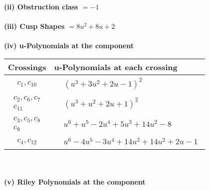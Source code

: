 \documentclass[1p]{elsarticle_modified}
\theoremstyle{definition}
\begin{document}
\flushleft \textbf{(ii) Obstruction class $= -1$}\\~\\
\flushleft \textbf{(iii) Cusp Shapes $= 8 u^2+8 u+2$}\\~\\
\newpage\renewcommand{\arraystretch}{1}
\flushleft \textbf{(iv) u-Polynomials at the component}\newline \\
\begin{tabular}{m{50pt}|m{274pt}}
Crossings & \hspace{64pt}u-Polynomials at each crossing \\
\hline $$\begin{aligned}c_{1},c_{10}\end{aligned}$$&$\begin{aligned}
&(u^3+3 u^2+2 u-1)^2
\end{aligned}$\\
\hline $$\begin{aligned}c_{2},c_{6},c_{7}\\c_{11}\end{aligned}$$&$\begin{aligned}
&(u^3+u^2+2 u+1)^2
\end{aligned}$\\
\hline $$\begin{aligned}c_{3},c_{5},c_{8}\\c_{9}\end{aligned}$$&$\begin{aligned}
&u^6+u^5-2 u^4+5 u^3+14 u^2-8
\end{aligned}$\\
\hline $$\begin{aligned}c_{4},c_{12}\end{aligned}$$&$\begin{aligned}
&u^6-4 u^5-3 u^4+14 u^3+14 u^2+2 u-1
\end{aligned}$\\
\hline
\end{tabular}\\~\\
\newpage\renewcommand{\arraystretch}{1}
\flushleft \textbf{(v) Riley Polynomials at the component}\newline \\
\end{document}
